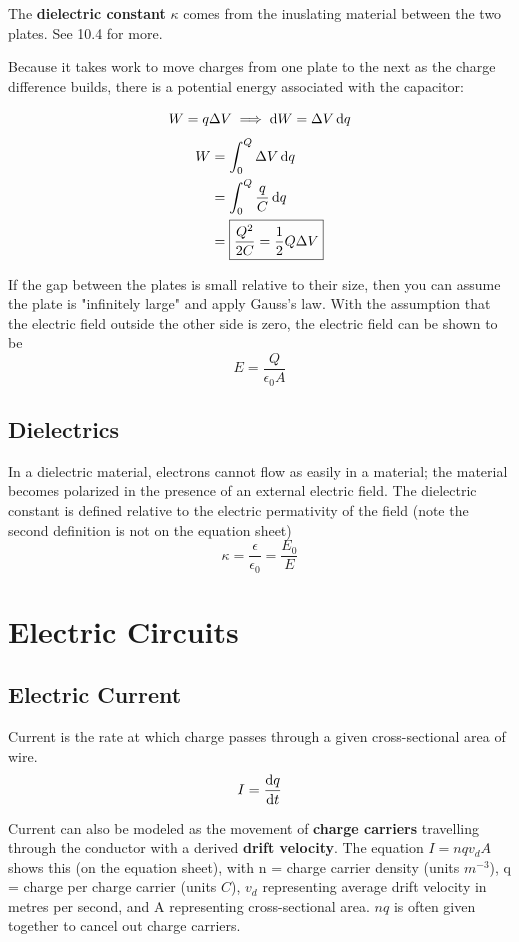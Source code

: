 \documentclass{article}
\begin{document}
The \textbf{dielectric constant} $\kappa$ comes from the inuslating material between the two plates. See 10.4 for more.

Because it takes work to move charges from one plate to the next as the charge difference builds, there is a potential energy associated with the capacitor:

\[W = q \Delta V \implies \odif{W} = \Delta V \odif{q}\]
\begin{align*}
    W &= \int_{0}^{Q} \Delta V \odif{q} \\
    &= \int_{0}^{Q} \frac{q}{C} \odif{q} \\
    &= \boxed{\frac{Q^2}{2C} = \frac{1}{2}Q\Delta V}
\end{align*}

If the gap between the plates is small relative to their size, then you can assume the plate is "infinitely large" and apply Gauss's law.
With the assumption that the electric field outside the other side is zero, the electric field can be shown to be
\[E = \frac{Q}{\epsilon_0 A}\]

\subsection{Dielectrics}

In a dielectric material, electrons cannot flow as easily in a material; the material becomes polarized in the presence of an external electric field.
The dielectric constant is defined relative to the electric permativity of the field (note the second definition is not on the equation sheet)
\[\kappa = \frac{\epsilon}{\epsilon_0} = \frac{E_0}{E}\]

\newpage

\section{Electric Circuits}

\subsection{Electric Current}
Current is the rate at which charge passes through a given cross-sectional area of wire.
\[I = \odv{q}{t}\]

Current can also be modeled as the movement of \textbf{charge carriers} travelling through the conductor with a derived \textbf{drift velocity}.
The equation $I = nqv_dA$ shows this (on the equation sheet), with n = charge carrier density (units $\unit{m^{-3}}$), q = charge per charge carrier (units $\unit{C}$), $v_d$ representing average drift velocity in metres per second, and A representing cross-sectional area.
$nq$ is often given together to cancel out charge carriers.
\end{document}
